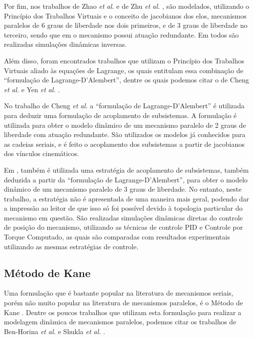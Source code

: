 \documentclass[]{politex}
\begin{document}
Por fim, nos trabalhos de Zhao \emph{et al.} \cite{Zhao, Zhao2} e de Zhu \emph{et al.} \cite{Zhu}, são modelados, utilizando o Princípio dos Trabalhos Virtuais e o conceito de jacobianos dos elos, mecanismos paralelos de 6 graus de liberdade nos dois primeiros, e de 3 graus de liberdade no terceiro, sendo que em \cite{Zhao2} o mecanismo possui atuação redundante. Em todos são realizadas simulações dinâmicas inversas.

Além disso, foram encontrados trabalhos que utilizam o Princípio dos Trabalhos Virtuais aliado às equações de Lagrange, os quais entitulam essa combinação de ``formulação de Lagrange-D’Alembert'', dentre os quais podemos citar o de Cheng \emph{et al.} \cite{ChengLiu} e Yen \emph{et al.} \cite{Yen}.

No trabalho de Cheng \emph{et al.} \cite{ChengLiu} a ``formulação de Lagrange-D’Alembert'' é utilizada para deduzir uma formulação de acoplamento de subsistemas. A formulação é utilizada para obter o modelo dinâmico de um mecanismo paralelo de 2 graus de liberdade com atuação redundante. São utilizados os modelos já conhecidos para as cadeias seriais, e é feito o acoplamento dos subsistemas a partir de jacobianos dos vínculos cinemáticos.

Em \cite{Yen}, também é utilizada uma estratégia de acoplamento de subsistemas, também deduzida a partir da ``formulação de Lagrange-D’Alembert'', para obter o modelo dinâmico de um mecanismo paralelo de 3 graus de liberdade. No entanto, neste trabalho, a estratégia não é apresentada de uma maneira mais geral, podendo dar a impressão ao leitor de que isso só foi possível devido à topologia particular do mecanismo em questão. São realizadas simulações dinâmicas diretas do controle de posição do mecanismo, utilizando as técnicas de controle PID e Controle por Torque Computado, as quais são comparadas com resultados experimentais utilizando as mesmas estratégias de controle.


\subsection{Método de Kane}

Uma formulação que é bastante popular na literatura de mecanismos seriais, porém não muito popular na literatura de mecanismos paralelos, é o Método de Kane \cite{Kane}. Dentre os poucos trabalhos que utilizam esta formulação para realizar a modelagem dinâmica de mecanismos paralelos, podemos citar os trabalhos de Ben-Horina \emph{et al.} \cite{BenHorina} e Shukla \emph{et al.} \cite{Shukla}.
\end{document}
